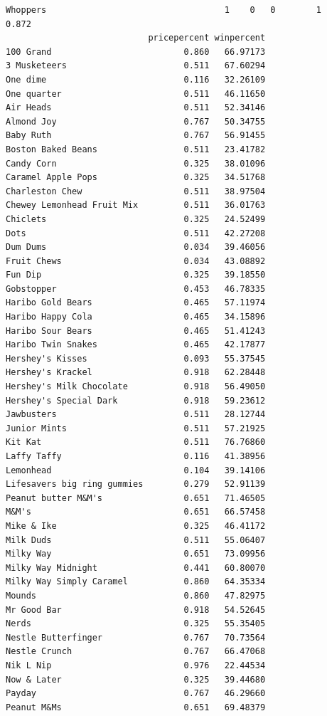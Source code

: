 \documentclass[
  letterpaper,
  DIV=11,
  numbers=noendperiod]{scrartcl}
\begin{document}
\begin{verbatim}
Whoppers                                   1    0   0        1        0.872
                            pricepercent winpercent
100 Grand                          0.860   66.97173
3 Musketeers                       0.511   67.60294
One dime                           0.116   32.26109
One quarter                        0.511   46.11650
Air Heads                          0.511   52.34146
Almond Joy                         0.767   50.34755
Baby Ruth                          0.767   56.91455
Boston Baked Beans                 0.511   23.41782
Candy Corn                         0.325   38.01096
Caramel Apple Pops                 0.325   34.51768
Charleston Chew                    0.511   38.97504
Chewey Lemonhead Fruit Mix         0.511   36.01763
Chiclets                           0.325   24.52499
Dots                               0.511   42.27208
Dum Dums                           0.034   39.46056
Fruit Chews                        0.034   43.08892
Fun Dip                            0.325   39.18550
Gobstopper                         0.453   46.78335
Haribo Gold Bears                  0.465   57.11974
Haribo Happy Cola                  0.465   34.15896
Haribo Sour Bears                  0.465   51.41243
Haribo Twin Snakes                 0.465   42.17877
Hershey's Kisses                   0.093   55.37545
Hershey's Krackel                  0.918   62.28448
Hershey's Milk Chocolate           0.918   56.49050
Hershey's Special Dark             0.918   59.23612
Jawbusters                         0.511   28.12744
Junior Mints                       0.511   57.21925
Kit Kat                            0.511   76.76860
Laffy Taffy                        0.116   41.38956
Lemonhead                          0.104   39.14106
Lifesavers big ring gummies        0.279   52.91139
Peanut butter M&M's                0.651   71.46505
M&M's                              0.651   66.57458
Mike & Ike                         0.325   46.41172
Milk Duds                          0.511   55.06407
Milky Way                          0.651   73.09956
Milky Way Midnight                 0.441   60.80070
Milky Way Simply Caramel           0.860   64.35334
Mounds                             0.860   47.82975
Mr Good Bar                        0.918   54.52645
Nerds                              0.325   55.35405
Nestle Butterfinger                0.767   70.73564
Nestle Crunch                      0.767   66.47068
Nik L Nip                          0.976   22.44534
Now & Later                        0.325   39.44680
Payday                             0.767   46.29660
Peanut M&Ms                        0.651   69.48379

\end{verbatim}
\end{document}
